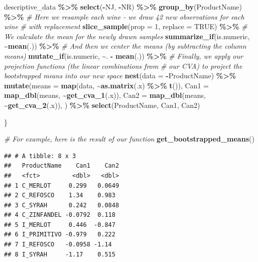 \documentclass[
]{book}
\newenvironment{Shaded}{\begin{snugshade}}{\end{snugshade}}
\newcommand{\AttributeTok}[1]{\textcolor[rgb]{0.13,0.29,0.53}{#1}}
\newcommand{\CommentTok}[1]{\textcolor[rgb]{0.56,0.35,0.01}{\textit{#1}}}
\newcommand{\ConstantTok}[1]{\textcolor[rgb]{0.56,0.35,0.01}{#1}}
\newcommand{\DecValTok}[1]{\textcolor[rgb]{0.00,0.00,0.81}{#1}}
\newcommand{\FunctionTok}[1]{\textcolor[rgb]{0.13,0.29,0.53}{\textbf{#1}}}
\newcommand{\NormalTok}[1]{#1}
\newcommand{\SpecialCharTok}[1]{\textcolor[rgb]{0.81,0.36,0.00}{\textbf{#1}}}
\begin{document}
\begin{Shaded}
\begin{Highlighting}[]
\NormalTok{  descriptive\_data }\SpecialCharTok{\%\textgreater{}\%}
  \FunctionTok{select}\NormalTok{(}\SpecialCharTok{{-}}\NormalTok{NJ, }\SpecialCharTok{{-}}\NormalTok{NR) }\SpecialCharTok{\%\textgreater{}\%}
  \FunctionTok{group\_by}\NormalTok{(ProductName) }\SpecialCharTok{\%\textgreater{}\%}
    \CommentTok{\# Here we resample each wine {-} we draw 42 new observations for each wine}
    \CommentTok{\# with replacement}
  \FunctionTok{slice\_sample}\NormalTok{(}\AttributeTok{prop =} \DecValTok{1}\NormalTok{, }\AttributeTok{replace =} \ConstantTok{TRUE}\NormalTok{) }\SpecialCharTok{\%\textgreater{}\%}
    \CommentTok{\# We calculate the mean for the newly drawn samples}
  \FunctionTok{summarize\_if}\NormalTok{(is.numeric, }\SpecialCharTok{\textasciitilde{}}\FunctionTok{mean}\NormalTok{(.)) }\SpecialCharTok{\%\textgreater{}\%} 
    \CommentTok{\# And then we center the means (by subtracting the column means)}
  \FunctionTok{mutate\_if}\NormalTok{(is.numeric, }\SpecialCharTok{\textasciitilde{}}\NormalTok{. }\SpecialCharTok{{-}} \FunctionTok{mean}\NormalTok{(.)) }\SpecialCharTok{\%\textgreater{}\%}
    \CommentTok{\# Finally, we apply our projection functions (the linear combinations from}
    \CommentTok{\# our CVA) to project the bootstrapped means into our new space}
  \FunctionTok{nest}\NormalTok{(}\AttributeTok{data =} \SpecialCharTok{{-}}\NormalTok{ProductName) }\SpecialCharTok{\%\textgreater{}\%}
  \FunctionTok{mutate}\NormalTok{(}\AttributeTok{means =} \FunctionTok{map}\NormalTok{(data, }\SpecialCharTok{\textasciitilde{}}\FunctionTok{as.matrix}\NormalTok{(.x) }\SpecialCharTok{\%\textgreater{}\%} \FunctionTok{t}\NormalTok{()),}
         \AttributeTok{Can1 =} \FunctionTok{map\_dbl}\NormalTok{(means, }\SpecialCharTok{\textasciitilde{}}\FunctionTok{get\_cva\_1}\NormalTok{(.x)),}
         \AttributeTok{Can2 =} \FunctionTok{map\_dbl}\NormalTok{(means, }\SpecialCharTok{\textasciitilde{}}\FunctionTok{get\_cva\_2}\NormalTok{(.x)),}
\NormalTok{         ) }\SpecialCharTok{\%\textgreater{}\%}
    \FunctionTok{select}\NormalTok{(ProductName, Can1, Can2)}
  
\NormalTok{\}}

\CommentTok{\# For example, here is the result of our function}
\FunctionTok{get\_bootstrapped\_means}\NormalTok{()}
\end{Highlighting}
\end{Shaded}

\begin{verbatim}
## # A tibble: 8 x 3
##   ProductName    Can1    Can2
##   <fct>         <dbl>   <dbl>
## 1 C_MERLOT     0.299   0.0649
## 2 C_REFOSCO    1.34    0.983 
## 3 C_SYRAH      0.242   0.0848
## 4 C_ZINFANDEL -0.0792  0.118 
## 5 I_MERLOT     0.446  -0.847 
## 6 I_PRIMITIVO -0.979   0.222 
## 7 I_REFOSCO   -0.0958 -1.14  
## 8 I_SYRAH     -1.17    0.515
\end{verbatim}
\end{document}

